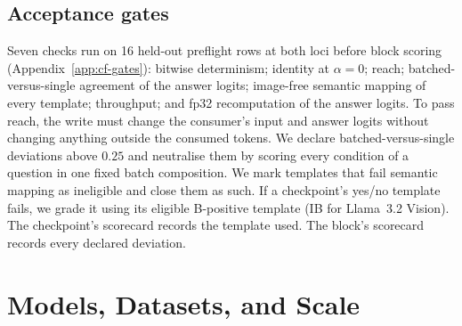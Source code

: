 \documentclass{article}
\begin{document}
\subsection{Acceptance gates}
\label{sec:gates}

Seven checks run on 16 held-out preflight rows at both loci before block scoring (Appendix~\ref{app:cf-gates}): bitwise determinism; identity at $\alpha=0$; reach; batched-versus-single agreement of the answer logits; image-free semantic mapping of every template; throughput; and fp32 recomputation of the answer logits. To pass reach, the write must change the consumer's input and answer logits without changing anything outside the consumed tokens. We declare batched-versus-single deviations above $0.25$ and neutralise them by scoring every condition of a question in one fixed batch composition. We mark templates that fail semantic mapping as ineligible and close them as such. If a checkpoint's yes/no template fails, we grade it using its eligible B-positive template (IB for Llama~3.2 Vision). The checkpoint's scorecard records the template used. The block's scorecard records every declared deviation.
\section{Models, Datasets, and Scale}
\label{sec:setup}
\end{document}
